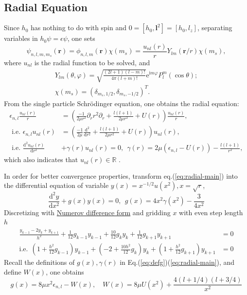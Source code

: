 \documentclass{article}
\newcommand{\ii}{\mathrm{i}}
\renewcommand{\d}{\mathrm{d}}
\newcommand{\e}{\mathrm{e}}
\begin{document}
\subsection{Radial Equation}
Since $h_0$ has nothing to do with spin and $0=[h_0,\bm{l}^2]=[h_0,l_z]$, separating variables in $h_0 \psi = \epsilon \psi$, one sets
\begin{equation}
\psi_{n,l,m,m_s}(\bm{r}) = \phi_{n,l,m}(\bm{r})\chi(m_s) = \frac{u_{nl}(r)}{r} Y_{lm}(\bm{r}/r) \chi(m_s),
\end{equation}
where $u_{nl}$ is the radial function to be solved, and
\begin{gather}
Y_{lm}(\theta,\varphi) = \sqrt{\frac{(2l+1)(l-m)!}{4\pi (l+m)!}}\e^{\ii m \varphi} P_l^m(\cos\theta);\\
\chi(m_s) = (\delta_{m_s,1/2}, \delta_{m_s,-1/2})^T .
\end{gather}
From the single particle Schr\"{o}dinger equation, one obtains the radial equation:
\begin{align}
\epsilon_{n,l} \frac{u_{nl}(r)}{r} &= \left(\frac{-1}{2\mu r^2}\partial_r r^2\partial_r + \frac{l(l+1)}{2\mu r^2} + U(r)\right) \frac{u_{nl}(r)}{r}, \\
\text{ i.e. }\epsilon_{n,l} u_{nl}(r) &= \left(\frac{-1}{2\mu}\frac{\d^2}{\d r^2}+ \frac{l(l+1)}{2\mu r^2} + U(r)\right) u_{nl}(r),\\
\text{ i.e. }\frac{\d^2u_{nl}(r)}{\d r^2}&+\gamma(r)u_{nl}(r) = 0\label{eq:radial-main},~~\gamma(r) = 2\mu(\epsilon_{n,l}-U(r))-\frac{l(l+1)}{r^2} ,
\end{align}
which also indicates that $u_{nl}(r)\in\mathbb{R}$ .

In order for better convergence properties, transform eq.(\ref{eq:radial-main}) into the differential equation of variable $y(x) = x^{-1/2}u(x^2), x = \sqrt{r}$, 
\begin{equation}
\frac{\d^2y}{\d x^2} + g(x) y(x) = 0,~~g(x) = 4x^2\gamma(x^2) -\frac{3}{4x^2}\label{eq:defg}
\end{equation}
Discretizing with \href{https://en.wikipedia.org/wiki/Numerov\%27s_method}{Numerov difference form} and gridding $x$ with even step length $h$
\begin{align}
\frac{y_{k-1}-2y_k+y_{k+1}}{h^2} + \frac{1}{12}g_{k-1}y_{k-1} + \frac{10}{12}g_{k}y_{k} +  \frac{1}{12}g_{k+1}y_{k+1}  &= 0 \\
\text{i.e.} ~~(1+\frac{h^2}{12}g_{k-1})y_{k-1} + (-2 +\frac{10 h^2}{12}g_k)y_k + (1+\frac{h^2}{12}g_{k+1})y_{k+1} &= 0\label{eq:radial-diffed}
\end{align}
Recall the definitions of $g(x), \gamma(r)$ in Eq.(\ref{eq:defg})(\ref{eq:radial-main}), and define $W(x)$, one obtains
\begin{equation}
g(x) = 8\mu x^2\epsilon_{n,l} - W(x),\quad W(x)= 8\mu U(x^2)+\frac{4(l+1/4)(l+3/4)}{ x^2}
\end{equation}
\end{document}
